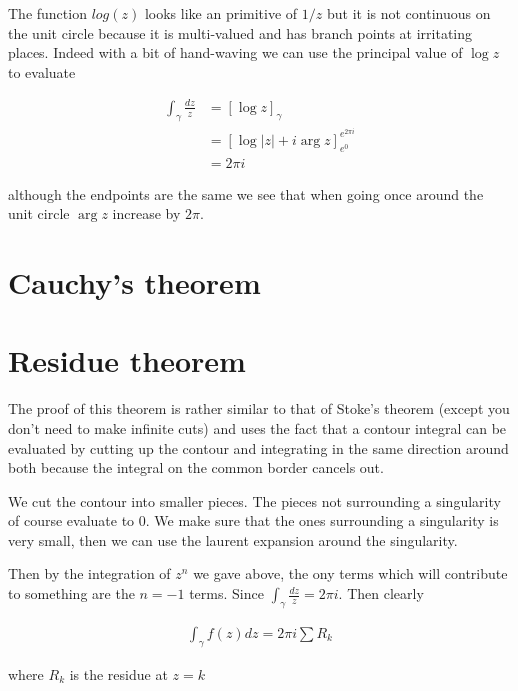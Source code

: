 \documentclass{article}
\begin{document}
The function $log(z)$ looks like an primitive of $1/z$ but it is not continuous on the unit circle because it is multi-valued and has branch points at irritating places. Indeed with a bit of hand-waving we can use the principal value of $\log z$ to evaluate

\begin{align}
\int_\gamma \frac{dz}{z} &= \left[ \log z \right]_\gamma \\
                         &= \left[ \log |z| + i \arg z \right]_{e^0}^{e^{2\pi i}} \\
                         &= 2\pi i
\end{align}

although the endpoints are the same we see that when going once around the unit circle $\arg z$ increase by $2\pi$.

\section{Cauchy's theorem}

\section{Residue theorem}

The proof of this theorem is rather similar to that of Stoke's theorem (except you don't need to make infinite cuts) and uses the fact that a contour integral can be evaluated by cutting up the contour and integrating in the same direction around both because the integral on the common border cancels out.

We cut the contour into smaller pieces. The pieces not surrounding a singularity of course evaluate to 0. We make sure that the ones surrounding a singularity is very small, then we can use the laurent expansion around the singularity.

Then by the integration of $z^n$ we gave above, the ony terms which will contribute to something are the $n=-1$ terms. Since $\int_\gamma \frac{dz}{z} = 2\pi i$. Then clearly 

\begin{align}
\int_\gamma f(z) dz = 2\pi i \sum R_k
\end{align}

where $R_k$ is the residue at $z=k$
\end{document}
